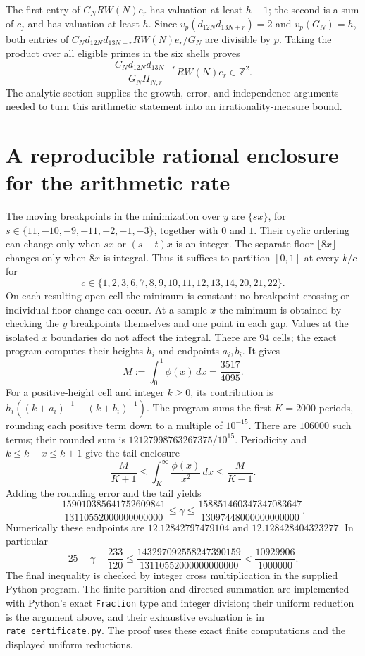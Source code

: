 \documentclass[11pt]{article}
\begin{document}
The first entry of $C_NRW(N)e_r$ has valuation at least $h-1$;
the second is a sum of $c_j$ and has valuation at least $h$.
Since $v_p(d_{12N}d_{13N+r})=2$ and $v_p(G_N)=h$, both entries of
$C_Nd_{12N}d_{13N+r}RW(N)e_r/G_N$ are divisible by $p$.
Taking the product over all eligible primes in the six shells proves
\[
 \boxed{\frac{C_Nd_{12N}d_{13N+r}}{G_NH_{N,r}}
                    RW(N)e_r\in\mathbb Z^2.}
\]
The analytic section supplies the growth, error, and independence arguments needed to turn this arithmetic statement into an irrationality-measure bound.



\section{A reproducible rational enclosure for the arithmetic rate}\label{app:rate}
The moving breakpoints in the minimization over $y$ are
$\{sx\}$, for
$s\in\{11,-10,-9,-11,-2,-1,-3\}$, together with $0$ and $1$.
Their cyclic ordering can change only when $sx$ or $(s-t)x$ is an
integer. The separate floor $\lfloor8x\rfloor$ changes only when
$8x$ is integral. Thus it suffices to partition $[0,1]$ at every
$k/c$ for
\[
 c\in\{1,2,3,6,7,8,9,10,11,12,13,14,20,21,22\}.
\]
On each resulting open cell the minimum is constant: no breakpoint
crossing or individual floor change can occur. At a sample $x$ the
minimum is obtained by checking the $y$ breakpoints themselves and
one point in each gap. Values at the isolated $x$ boundaries do not
affect the integral. There are $94$ cells; the exact program computes
their heights $h_i$ and endpoints $a_i,b_i$. It gives
\[
 M:=\int_0^1\phi(x)\,dx=\frac{3517}{4095}.
\]
For a positive-height cell and integer $k\ge0$, its contribution is
$h_i((k+a_i)^{-1}-(k+b_i)^{-1})$.
The program sums the first $K=2000$ periods, rounding each positive
term down to a multiple of $10^{-15}$. There are $106000$ such terms;
their rounded sum is $12127998763267375/10^{15}$.
Periodicity and $k\le k+x\le k+1$ give the tail enclosure
\[
 \frac{M}{K+1}\le
 \int_K^\infty\frac{\phi(x)}{x^2}\,dx
 \le\frac{M}{K-1}.
\]
Adding the rounding error and the tail yields
\[
 \frac{159010385641752609841}{13110552000000000000}
 \le\gamma\le
 \frac{158851460347347083647}{13097448000000000000}.
\]
Numerically these endpoints are $12.12842797479104$ and
$12.128428404323277$. In particular
\[
 25-\gamma-\frac{233}{120}
 \le\frac{143297092558247390159}{13110552000000000000}
 <\frac{10929906}{1000000}.
\]
The final inequality is checked by integer cross multiplication in the supplied Python program. The finite partition and
directed summation are implemented with Python's exact
\texttt{Fraction} type and integer division; their uniform reduction
is the argument above, and their exhaustive evaluation is in
\texttt{rate\_certificate.py}. The proof uses these exact finite computations and the displayed uniform reductions.
\end{document}
